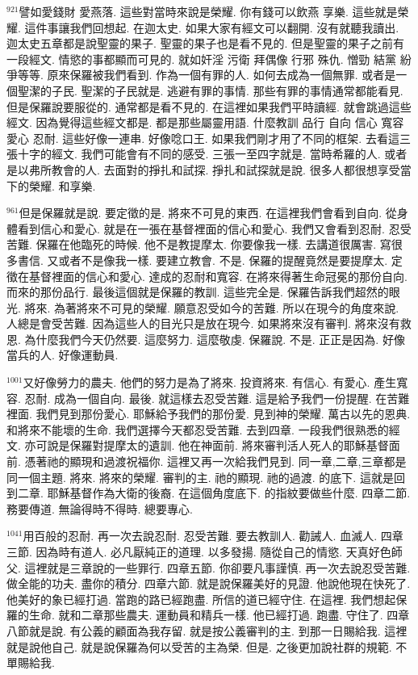 \documentclass{book}
\begin{document}
$^{921}$譬如愛錢財 愛燕落.
這些對當時來說是榮耀.
你有錢可以飲燕 享樂.
這些就是榮耀.
這件事讓我們回想起.
在迦太史.
如果大家有經文可以翻開.
沒有就聽我讀出.
迦太史五章都是說聖靈的果子.
聖靈的果子也是看不見的.
但是聖靈的果子之前有一段經文.
情慾的事都顯而可見的.
就如奸淫 污衛 拜偶像 行邪 殊仇.
憎勁 結黨 紛爭等等.
原來保羅被我們看到.
作為一個有罪的人.
如何去成為一個無罪.
或者是一個聖潔的子民.
聖潔的子民就是.
逃避有罪的事情.
那些有罪的事情通常都能看見.
但是保羅說要服從的.
通常都是看不見的.
在這裡如果我們平時讀經.
就會跳過這些經文.
因為覺得這些經文都是.
都是那些屬靈用語.
什麼教訓 品行 自向 信心 寬容 愛心 忍耐.
這些好像一連串.
好像唸口王.
如果我們剛才用了不同的框架.
去看這三張十字的經文.
我們可能會有不同的感受.
三張一至四字就是.
當時希羅的人.
或者是以弗所教會的人.
去面對的掙扎和試探.
掙扎和試探就是說.
很多人都很想享受當下的榮耀.
和享樂.

$^{961}$但是保羅就是說.
要定徵的是.
將來不可見的東西.
在這裡我們會看到自向.
從身體看到信心和愛心.
就是在一張在基督裡面的信心和愛心.
我們又會看到忍耐.
忍受苦難.
保羅在他臨死的時候.
他不是教提摩太.
你要像我一樣.
去講道很厲害.
寫很多書信.
又或者不是像我一樣.
要建立教會.
不是.
保羅的提醒竟然是要提摩太.
定徵在基督裡面的信心和愛心.
達成的忍耐和寬容.
在將來得著生命冠冕的那份自向.
而來的那份品行.
最後這個就是保羅的教訓.
這些完全是.
保羅告訴我們超然的眼光.
將來.
為著將來不可見的榮耀.
願意忍受如今的苦難.
所以在現今的角度來說.
人總是會受苦難.
因為這些人的目光只是放在現今.
如果將來沒有審判.
將來沒有救恩.
為什麼我們今天仍然要.
這麼努力.
這麼敬虔.
保羅說.
不是.
正正是因為.
好像當兵的人.
好像運動員.

$^{1001}$又好像勞力的農夫.
他們的努力是為了將來.
投資將來.
有信心.
有愛心.
產生寬容.
忍耐.
成為一個自向.
最後.
就這樣去忍受苦難.
這是給予我們一份提醒.
在苦難裡面.
我們見到那份愛心.
耶穌給予我們的那份愛.
見到神的榮耀.
萬古以先的恩典.
和將來不能壞的生命.
我們選擇今天都忍受苦難.
去到四章.
一段我們很熟悉的經文.
亦可說是保羅對提摩太的遺訓.
他在神面前.
將來審判活人死人的耶穌基督面前.
憑著祂的顯現和過渡祝福你.
這裡又再一次給我們見到.
同一章,二章,三章都是同一個主題.
將來.
將來的榮耀.
審判的主.
祂的顯現.
祂的過渡.
的底下.
這就是回到二章.
耶穌基督作為大衛的後裔.
在這個角度底下.
的指紋要做些什麼.
四章二節.
務要傳道.
無論得時不得時.
總要專心.

$^{1041}$用百般的忍耐.
再一次去說忍耐.
忍受苦難.
要去教訓人.
勸誡人.
血滅人.
四章三節.
因為時有道人.
必凡厭純正的道理.
以多發揚.
隨從自己的情慾.
天真好色師父.
這裡就是三章說的一些罪行.
四章五節.
你卻要凡事謹慎.
再一次去說忍受苦難.
做全能的功夫.
盡你的積分.
四章六節.
就是說保羅美好的見證.
他說他現在快死了.
他美好的象已經打過.
當跑的路已經跑盡.
所信的道已經守住.
在這裡.
我們想起保羅的生命.
就和二章那些農夫.
運動員和精兵一樣.
他已經打過.
跑盡.
守住了.
四章八節就是說.
有公義的顧面為我存留.
就是按公義審判的主.
到那一日賜給我.
這裡就是說他自己.
就是說保羅為何以受苦的主為榮.
但是.
之後更加說社群的規範.
不單賜給我.
\end{document}
